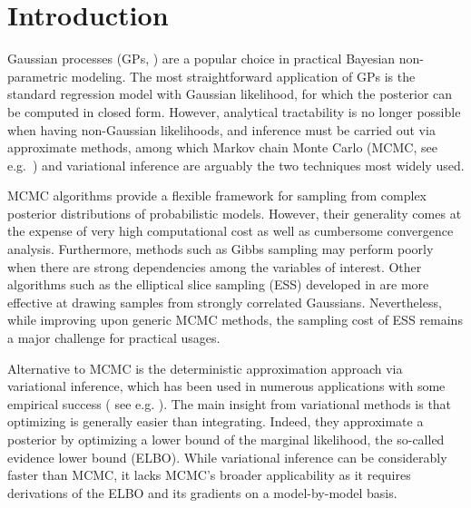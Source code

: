 \section{Introduction}
Gaussian processes (GPs, \cite{rasmussen-williams-book}) are a popular 
choice in practical Bayesian non-parametric modeling. %
%
The most straightforward application of GPs is the standard regression model with Gaussian likelihood,
for which the posterior can be computed in closed form. 
However, analytical tractability is no longer possible when having  non-Gaussian likelihoods, and inference must be carried out via  approximate methods, among which Markov chain Monte Carlo (MCMC, see e.g.~\cite{neal1993probabilistic}) 
and variational inference \cite{jordan1998introduction} are arguably the two techniques most widely used.

MCMC algorithms provide a flexible framework for sampling from complex posterior distributions of probabilistic models.
However, their generality comes at the expense 
of very high computational cost as well as cumbersome convergence analysis. 
Furthermore, methods such as Gibbs sampling may perform poorly when there are strong dependencies among the variables of interest. 
Other algorithms such as the elliptical slice sampling (ESS) developed in  \cite{murray2009elliptical}  
are more effective at drawing samples from 
strongly correlated Gaussians. Nevertheless, while improving upon generic MCMC methods, the sampling cost of 
ESS remains a major challenge for practical usages.

Alternative to MCMC is the deterministic approximation approach via variational inference, 
which has been used in numerous applications  with some empirical success ( see e.g. \cite{khan2012stick,nickisch2008approximations, nguyen2013efficient,
khan2012fast, lazaro2012bayesian, girolami2006variational, lazaro2011variational}).
The main insight from variational methods is that  optimizing is generally easier than integrating. 
Indeed, they approximate a posterior by optimizing a lower bound of the 
marginal likelihood,  the so-called evidence lower bound (ELBO). 
While variational inference can be considerably faster than MCMC, it lacks MCMC's broader applicability as it requires derivations of the ELBO and its gradients on a model-by-model basis.

